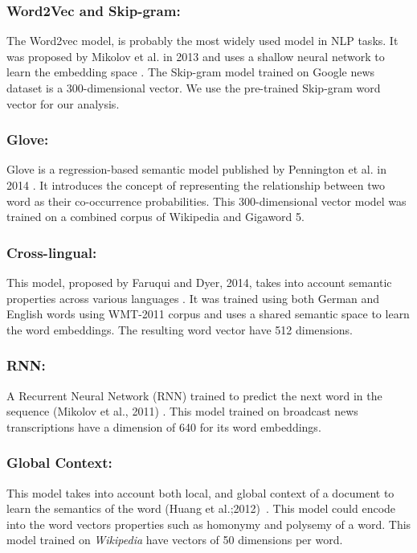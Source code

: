 \subsubsection{Word2Vec and Skip-gram:} The Word2vec model, is probably the most widely
used model in NLP tasks. It was proposed by Mikolov et al. in
2013 and uses a shallow neural network to learn the embedding
space \cite{Word2Vec}. The Skip-gram model trained on Google
news dataset is a 300-dimensional vector. We use the pre-trained Skip-gram word vector for our analysis.


\subsubsection{Glove:} 
Glove is a regression-based semantic model published by Pennington et al. in 2014 \cite{Glove}. It introduces the concept of representing the relationship between two word as their co-occurrence probabilities. This 300-dimensional vector model was trained on a combined corpus of Wikipedia and Gigaword 5.

\subsubsection{Cross-lingual:} This model, proposed by Faruqui
and Dyer, 2014, takes into account semantic properties across various languages \cite{Crosslingual}. It was trained using both German and English words using WMT-2011 corpus and uses a shared semantic space to learn the word embeddings. The resulting word vector
have 512 dimensions.

\subsubsection{RNN:} A Recurrent Neural Network (RNN) trained to predict the next word in the sequence (Mikolov et
al., 2011) \cite{RNN}. This model trained on broadcast news transcriptions have a dimension of 640 for its word embeddings.


\subsubsection{Global Context:} This model takes into account both local,
and global context of a document to learn the semantics of the word (Huang et al.;2012)~\cite{GlobalContext}. This model could encode into the word vectors properties such as homonymy and polysemy of a word. This model trained on  \textit{Wikipedia} have vectors of 50 dimensions per word.

